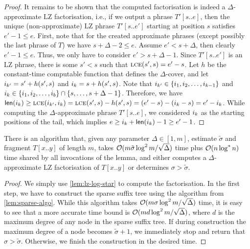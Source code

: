 \begin{proof}
It remains to be shown that the computed factorisation is indeed a $\Delta$-approximate LZ factorisation, i.e., if we output a phrase $T'[s..e]$, then the unique (non-approximate) LZ phrase $T'[s..e']$ starting at position $s$ satisfies $e' - 1 \leq e$. 
First, note that for the created approximate phrases (except possibly the last phrase of $T$) we have $s + \Delta - 2 \leq e$.
Assume $e' < s + \Delta$, then clearly $e' - 1 \leq e$.
Thus, we only have to consider $e' > s + \Delta - 1$.
Since $T'[s..e']$ is an LZ phrase, there is some $s' < s$ such that $\textnormal{\textsc{lce}}(s', s) = e' - s$.
Let $h$ be the constant-time computable function that defines the $\Delta$-cover, and let $i_{k'} = s' + h(s', s)$ and $i_k = s + h(s', s)$. 
Note that $i_{k'} \in \{i_1, i_2, \dots,i_{k - 1}\}$ and $i_k \in \{i_1, i_2, \dots,i_b\} \cap \{s, \dots, s + \Delta - 1\}$.
Therefore, we have $\textnormal{\textsf{len}}(i_k) \geq \textnormal{\textsc{lce}}(i_{k'}, i_k) = \textnormal{\textsc{lce}}(s', s) - h(s', s) = (e' - s) - (i_k - s) = e' - i_k$. While computing the $\Delta$-approximate phrase $T'[s..e]$, we considered $i_k$ as the starting positions of the tail, which implies $e \geq i_k + \textnormal{\textsf{len}}(i_k) - 1 \geq e' - 1$.
\end{proof}


\begin{lemma}
\label{lem:compute3}
There is an algorithm that, given any parameter $\Delta \in [1,m]$, estimate $\tilde{\sigma}$ and fragment $T[x..y]$ of length $m$, takes
$\mathcal{O}(m\tilde{\sigma}\log^2 m/\sqrt{\Delta})$ time plus $\mathcal{O}(n \log^* n)$ time shared by all invocations of the lemma, and either computes a $\Delta$-approximate LZ factorisation of $T[x..y]$ or
determines $\sigma>\tilde{\sigma}$.
\begin{proof}
We simply use \cref{lem:lz-log-star} to compute the factorisation. In the first step, we have to construct the sparse suffix tree using the algorithm from \cref{lem:sparse-algo}. While this algorithm takes $\mathcal{O}(m\sigma\log^2 m / \sqrt{\Delta})$ time, it is easy to see that a more accurate time bound is $\mathcal{O}(md\log^2 m / \sqrt{\Delta})$, where $d$ is the maximum degree of any node in the sparse suffix tree. If during construction the maximum degree of a node becomes $\tilde{\sigma} + 1$, we immediately stop and return that $\sigma>\tilde{\sigma}$. Otherwise, we finish the construction in the desired time.
\end{proof}
\end{lemma}

